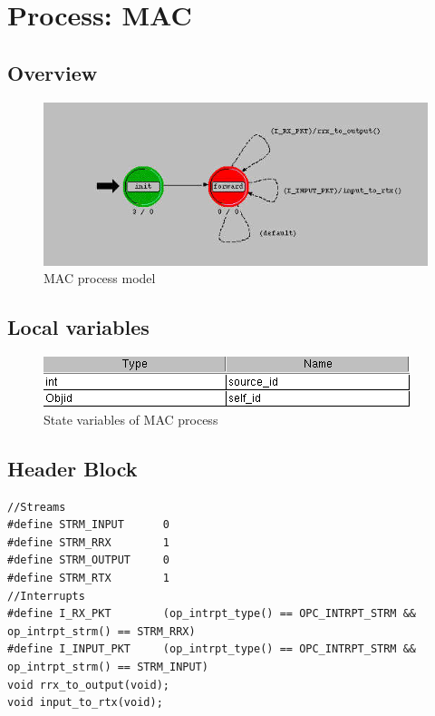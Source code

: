 
\section{Process: MAC}

\subsection{Overview}
\begin{figure}[ht]
    \centering
    \includegraphics[width=.7\textwidth]{images/mac}
    \caption{MAC process model}
    \label{fig:appendix-d}
\end{figure}

\subsection{Local variables}
\begin{figure}[ht]
    \centering
    \includegraphics[width=.7\textwidth]{images/state_variable_mac}
    \caption{State variables of MAC process}
    \label{fig:appendix-d_sv}
\end{figure}

\subsection{Header Block}
{\tiny
\begin{verbatim}
//Streams
#define STRM_INPUT		0
#define STRM_RRX		1
#define STRM_OUTPUT 	0
#define STRM_RTX		1
//Interrupts
#define I_RX_PKT		(op_intrpt_type() == OPC_INTRPT_STRM && op_intrpt_strm() == STRM_RRX)
#define I_INPUT_PKT		(op_intrpt_type() == OPC_INTRPT_STRM && op_intrpt_strm() == STRM_INPUT)
void rrx_to_output(void);
void input_to_rtx(void);

\end{verbatim}
}

